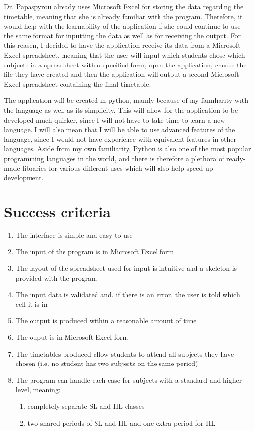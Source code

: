 \documentclass[a4paper, 12pt]{article}
\begin{document}
Dr. Papaspyrou already uses Microsoft Excel for storing the data regarding the timetable,
meaning that she is already familiar with the program. Therefore, it would help with the
learnability of the application if she could continue to use the same format for inputting
the data as well as for receiving the output. For this reason, I decided to have the
application receive its data from a Microsoft Excel spreadsheet, meaning that the user will
input which students chose which subjects in a spreadsheet with a specified form, open the
application, choose the file they have created and then the application will output a second
Microsoft Excel spreadsheet containing the final timetable.

The application will be created in python, mainly because of my familiarity with the
language as well as its simplicity. This will allow for the application to be developed much
quicker, since I will not have to take time to learn a new language. I will also mean that I
will be able to use advanced features of the language, since I would not have experience
with equivalent features in other languages. Aside from my own familiarity, Python is also
one of the most popular programming languages in the world, and there is therefore a
plethora of ready-made libraries for various different uses which will also help speed up
development. 

\section{Success criteria}

\begin{enumerate}
    \item The interface is simple and easy to use
    \item The input of the program is in Microsoft Excel form
    \item The layout of the spreadsheet used for input is intuitive and a skeleton is
        provided with the program
    \item The input data is validated and, if there is an error, the user is told which cell
        it is in
    \item The output is produced within a reasonable amount of time
    \item The ouput is in Microsoft Excel form
    \item The timetables produced allow students to attend all subjects they have chosen
        (i.e. no student has two subjects on the same period)
    \item The program can handle each case for subjects with a standard and higher level,
        meaning:
        \begin{enumerate}
            \item completely separate SL and HL classes
            \item two shared periods of SL and HL and one extra period for HL
        \end{enumerate}
\end{enumerate}
\end{document}
